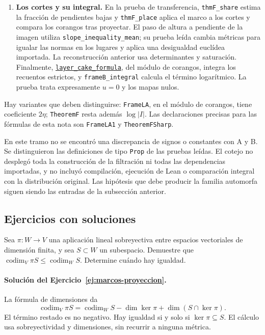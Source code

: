 \begin{enumerate}
\item \textbf{Los cortes y su integral.}
En la prueba de transferencia, \texttt{thmF\_share} estima la
fracción de pendientes bajas y \texttt{thmF\_place} aplica el marco
a los cortes y compara los corangos tras proyectar.
El paso de altura a pendiente de la imagen utiliza
\texttt{slope\_inequality\_mean}; su prueba leída cambia métricas
para igualar las normas en los lugares y aplica una desigualdad
euclídea importada. La reconstrucción anterior usa determinantes
y saturación. Finalmente,
\href{https://github.com/CocoSgt/riemann-hypothesis-lean/blob/7cbf7a0c32fca1badf05931879a37c3f8a2b03b4/src/Formalism/CorankShare/CorankShareProofs/LayerCakeFormula.lean}{\texttt{layer\_cake\_formula}},
del módulo de corangos, integra los recuentos
estrictos, y \texttt{frameB\_integral} calcula el término logarítmico.
La prueba trata expresamente $u=0$ y los mapas nulos.
\end{enumerate}

Hay variantes que deben distinguirse: \texttt{FrameLA}, en el módulo
de corangos, tiene coeficiente $2\eta$; \texttt{TheoremF} resta además
$\log|I|$. Las declaraciones precisas para las fórmulas de esta nota
son \texttt{FrameLA1} y \texttt{TheoremFSharp}.

En este tramo no se encontró una discrepancia de signos o constantes
con A y B. Se distinguieron las definiciones de tipo \texttt{Prop}
de las pruebas leídas. El cotejo no desplegó toda la construcción de la
filtración ni todas las dependencias importadas, y no incluyó compilación,
ejecución de Lean o comparación integral con la distribución original.
Las hipótesis que debe producir la familia automorfa siguen siendo las
entradas de la subsección anterior.

\subsection{Ejercicios con soluciones}

\begin{ejercicio}\label{ej:marcos-proyeccion}
Sea $\pi:W\to V$ una aplicación lineal sobreyectiva entre espacios
vectoriales de dimensión finita, y sea $S\subset W$ un subespacio.
Demuestre que
$\operatorname{codim}_V\pi S\le\operatorname{codim}_W S$.
Determine cuándo hay igualdad.
\end{ejercicio}

\paragraph{Solución del Ejercicio~\ref{ej:marcos-proyeccion}.}
La fórmula de dimensiones da
\[
 \operatorname{codim}_V\pi S
 =\operatorname{codim}_W S-\dim\ker\pi+\dim(S\cap\ker\pi).
\]
El término restado es no negativo. Hay igualdad si y solo si
$\ker\pi\subseteq S$. El cálculo usa sobreyectividad y dimensiones,
sin recurrir a ninguna métrica.

